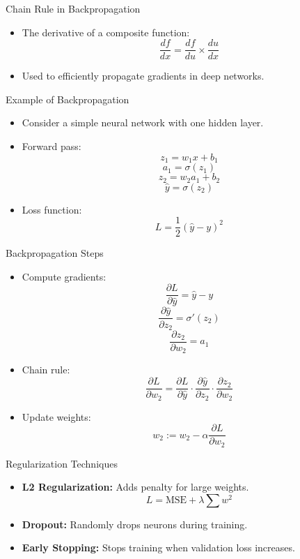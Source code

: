 \documentclass{beamer}
\begin{document}
\begin{frame}{Chain Rule in Backpropagation}
    \begin{itemize}
        \item The derivative of a composite function:
        \[
        \frac{df}{dx} = \frac{df}{du} \times \frac{du}{dx}
        \]
        \item Used to efficiently propagate gradients in deep networks.
    \end{itemize}
\end{frame}

\begin{frame}{Example of Backpropagation}
    \begin{itemize}
        \item Consider a simple neural network with one hidden layer.
        \item Forward pass:
        \[
        z_1 = w_1 x + b_1
        \]
        \[
        a_1 = \sigma(z_1)
        \]
        \[
        z_2 = w_2 a_1 + b_2
        \]
        \[
        \hat{y} = \sigma(z_2)
        \]
        \item Loss function:
        \[
        L = \frac{1}{2} (\hat{y} - y)^2
        \]
    \end{itemize}
\end{frame}

\begin{frame}{Backpropagation Steps}
    \begin{itemize}
        \item Compute gradients:
        \[
        \frac{\partial L}{\partial \hat{y}} = \hat{y} - y
        \]
        \[
        \frac{\partial \hat{y}}{\partial z_2} = \sigma'(z_2)
        \]
        \[
        \frac{\partial z_2}{\partial w_2} = a_1
        \]
        \item Chain rule:
        \[
        \frac{\partial L}{\partial w_2} = \frac{\partial L}{\partial \hat{y}} \cdot \frac{\partial \hat{y}}{\partial z_2} \cdot \frac{\partial z_2}{\partial w_2}
        \]
        \item Update weights:
        \[
        w_2 := w_2 - \alpha \frac{\partial L}{\partial w_2}
        \]
    \end{itemize}
\end{frame}

\begin{frame}{Regularization Techniques}
    \begin{itemize}
        \item \textbf{L2 Regularization:} Adds penalty for large weights.
        \[
        L = \text{MSE} + \lambda \sum w^2
        \]
        \item \textbf{Dropout:} Randomly drops neurons during training.
        \item \textbf{Early Stopping:} Stops training when validation loss increases.
    \end{itemize}
\end{frame}
\end{document}
